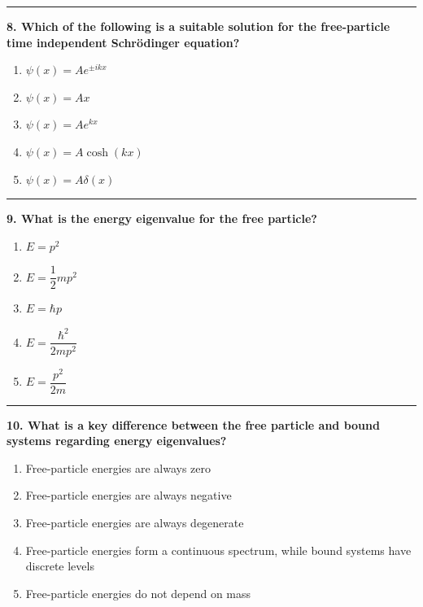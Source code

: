 \documentclass[
  english,
  9pt,
]{extbook}
\providecommand{\tightlist}{%
  \setlength{\itemsep}{0pt}\setlength{\parskip}{0pt}}
\theoremstyle{definition}
\theoremstyle{definition}
\theoremstyle{definition}
\theoremstyle{definition}
\theoremstyle{remark}
\begin{document}
\begin{center}\rule{0.5\linewidth}{0.5pt}\end{center}

\textbf{8. Which of the following is a suitable solution for the free-particle time independent Schrödinger equation?}

\begin{enumerate}
\def\labelenumi{\alph{enumi}.}
\tightlist
\item
  \(\psi(x) = A e^{\pm i k x}\)\\
\item
  \(\psi(x) = A x\)\\
\item
  \(\psi(x) = A e^{k x}\)\\
\item
  \(\psi(x) = A \cosh(kx)\)\\
\item
  \(\psi(x) = A \delta(x)\)
\end{enumerate}

\begin{center}\rule{0.5\linewidth}{0.5pt}\end{center}

\textbf{9. What is the energy eigenvalue for the free particle?}

\begin{enumerate}
\def\labelenumi{\alph{enumi}.}
\tightlist
\item
  \(E = p^2\)\\
\item
  \(E = \dfrac{1}{2} m p^2\)\\
\item
  \(E = \hbar p\)\\
\item
  \(E = \dfrac{\hbar^2}{2m p^2}\)\\
\item
  \(E = \dfrac{p^2}{2m}\)
\end{enumerate}

\begin{center}\rule{0.5\linewidth}{0.5pt}\end{center}

\textbf{10. What is a key difference between the free particle and bound systems regarding energy eigenvalues?}

\begin{enumerate}
\def\labelenumi{\alph{enumi}.}
\tightlist
\item
  Free-particle energies are always zero\\
\item
  Free-particle energies are always negative\\
\item
  Free-particle energies are always degenerate\\
\item
  Free-particle energies form a continuous spectrum, while bound systems have discrete levels
\item
  Free-particle energies do not depend on mass
\end{enumerate}
\end{document}
